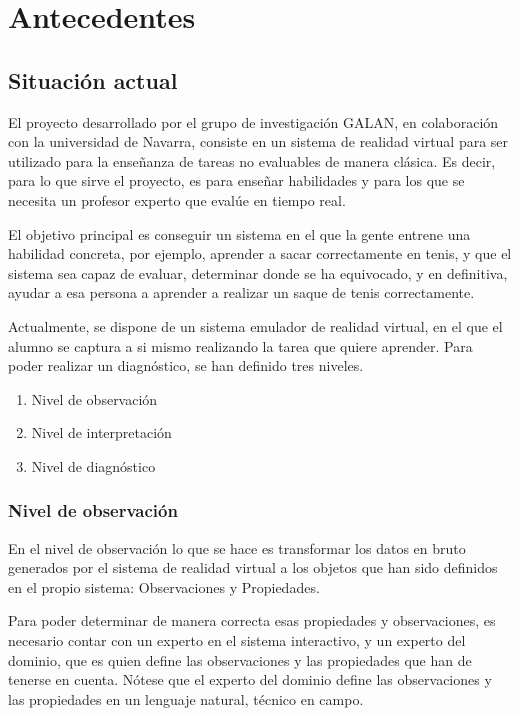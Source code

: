 \chapter{Antecedentes}

\section{Situaci\'on actual}
El proyecto desarrollado por el grupo de investigaci\'on GALAN, en colaboraci\'on con la universidad de Navarra, 
consiste en un sistema de realidad virtual para ser utilizado para la ense\~nanza de tareas no evaluables de manera
cl\'asica. Es decir, para lo que sirve el proyecto, es para ense\~nar habilidades y para los que se necesita un 
profesor experto que eval\'ue en tiempo real.

El objetivo principal es conseguir un sistema en el que la gente entrene una habilidad concreta, por ejemplo, aprender
a sacar correctamente en tenis, y que el sistema sea capaz de evaluar, determinar donde se ha equivocado, y en definitiva,
ayudar a esa persona a aprender a realizar un saque de tenis correctamente.

Actualmente, se dispone de un sistema emulador de realidad virtual, en el que el alumno se captura a si mismo realizando
la tarea que quiere aprender. Para poder realizar un diagn\'ostico, se han definido tres niveles.

\begin{enumerate}
	\item Nivel de observaci\'on
	\item Nivel de interpretaci\'on
	\item Nivel de diagn\'ostico
\end{enumerate}

\subsection{Nivel de observaci\'on}
En el nivel de observaci\'on lo que se hace es transformar los datos en bruto generados por el sistema de realidad virtual
a los objetos que han sido definidos en el propio sistema: Observaciones y Propiedades.

Para poder determinar de manera correcta esas propiedades y observaciones, es necesario contar con un 
experto en el sistema interactivo, y un experto del dominio, que es quien define las observaciones y las
propiedades que han de tenerse en cuenta. N\'otese que el experto del dominio define las observaciones y las
propiedades en un lenguaje natural, t\'ecnico en campo.

